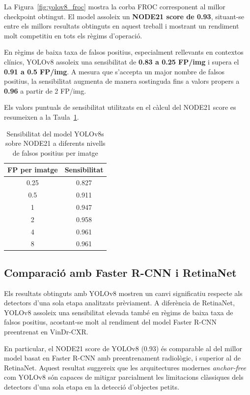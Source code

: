 \documentclass[conference]{IEEEtran}
\begin{document}
La Figura~\ref{fig:yolov8_froc} mostra la corba FROC corresponent al millor checkpoint
obtingut. El model assoleix un \textbf{NODE21 score de 0.93}, situant-se entre els
millors resultats obtinguts en aquest treball i mostrant un rendiment molt competitiu
en tots els règims d’operació.

En règims de baixa taxa de falsos positius, especialment rellevants en contextos
clínics, YOLOv8 assoleix una sensibilitat de \textbf{0.83 a 0.25 FP/img} i supera el
\textbf{0.91 a 0.5 FP/img}. A mesura que s’accepta un major nombre de falsos positius,
la sensibilitat augmenta de manera sostinguda fins a valors propers a \textbf{0.96}
a partir de 2 FP/img.

Els valors puntuals de sensibilitat utilitzats en el càlcul del NODE21 score es
resumeixen a la Taula~\ref{tab:yolov8_sensitivity}.

\begin{table}[H]
\centering
\footnotesize
\caption{Sensibilitat del model YOLOv8s sobre NODE21 a diferents nivells de falsos positius per imatge}
\label{tab:yolov8_sensitivity}
\setlength{\tabcolsep}{6pt}
\begin{tabular}{cc}
\toprule
\textbf{FP per imatge} & \textbf{Sensibilitat} \\
\midrule
0.25 & 0.827 \\
0.5  & 0.911 \\
1    & 0.947 \\
2    & 0.958 \\
4    & 0.961 \\
8    & 0.961 \\
\bottomrule
\end{tabular}
\end{table}


\subsection{Comparació amb Faster R-CNN i RetinaNet}

Els resultats obtinguts amb YOLOv8 mostren un canvi significatiu respecte als
detectors d’una sola etapa analitzats prèviament. A diferència de RetinaNet,
YOLOv8 assoleix una sensibilitat elevada també en règims de baixa taxa de falsos
positius, acostant-se molt al rendiment del model Faster R-CNN preentrenat en
VinDr-CXR.

En particular, el NODE21 score de YOLOv8 (0.93) és comparable al del millor model
basat en Faster R-CNN amb preentrenament radiològic, i superior al de RetinaNet.
Aquest resultat suggereix que les arquitectures modernes \textit{anchor-free}
com YOLOv8 són capaces de mitigar parcialment les limitacions clàssiques dels
detectors d’una sola etapa en la detecció d’objectes petits.
\end{document}
